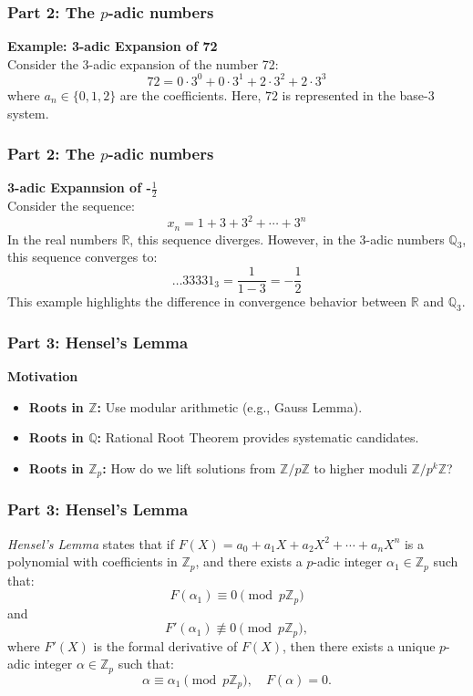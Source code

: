 \documentclass{beamer}
\begin{document}
\begin{frame}
    \frametitle{Part 2: The \( p \)-adic numbers}

    \textbf{Example: 3-adic Expansion of 72} \\
    Consider the 3-adic expansion of the number 72:
    \[
        72 = 0 \cdot 3^0 + 0 \cdot 3^1 + 2 \cdot 3^2 + 2 \cdot 3^3
    \]
    where \( a_n \in \{0, 1, 2\} \) are the coefficients. Here, \( 72 \) is represented in the base-3 system.
\end{frame}

\begin{frame}
    \frametitle{Part 2: The \( p \)-adic numbers}
    	\textbf{3-adic Expannsion of -$\frac{1}{2}$ }\\
    Consider the sequence:
    \[
        x_n = 1 + 3 + 3^2 + \cdots + 3^n
    \]
    In the real numbers \( \mathbb{R} \), this sequence diverges. However, in the 3-adic numbers \( \mathbb{Q}_3 \), this sequence converges to:
    \[
        \ldots 33331_3 = \frac{1}{1-3} = -\frac{1}{2}
    \]
    This example highlights the difference in convergence behavior between \( \mathbb{R} \) and \( \mathbb{Q}_3 \).
\end{frame}


\begin{frame}
    \frametitle{Part 3: Hensel's Lemma}

    \textbf{Motivation}  
\begin{itemize}
    \item \textbf{Roots in \( \mathbb{Z} \):} Use modular arithmetic (e.g., Gauss Lemma).  
    \item \textbf{Roots in \( \mathbb{Q} \):} Rational Root Theorem provides systematic candidates.  
    \item \textbf{Roots in \( \mathbb{Z}_p \):} How do we lift solutions from \( \mathbb{Z}/p\mathbb{Z} \) to higher moduli \( \mathbb{Z}/p^k\mathbb{Z} \)?
\end{itemize}
    
\end{frame}



\begin{frame}
    \frametitle{Part 3: Hensel's Lemma}
    \begin{theorem}
        \textit{Hensel's Lemma} states that if \( F(X) = a_0 + a_1 X + a_2 X^2 + \cdots + a_n X^n \) is a polynomial with coefficients in \( \mathbb{Z}_p \), and there exists a \( p \)-adic integer \( \alpha_1 \in \mathbb{Z}_p \) such that:
        \[ F(\alpha_1) \equiv 0 \pmod{p \mathbb{Z}_p} \]
        and
        \[ F'(\alpha_1) \not\equiv 0 \pmod{p \mathbb{Z}_p}, \]
        where \( F'(X) \) is the formal derivative of \( F(X) \), then there exists a unique \( p \)-adic integer \( \alpha \in \mathbb{Z}_p \) such that:
        \[ \alpha \equiv \alpha_1 \pmod{p \mathbb{Z}_p}, \quad F(\alpha) = 0. \]
    \end{theorem}
\end{frame}
\end{document}
